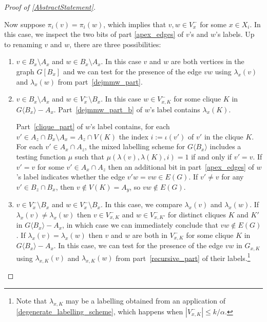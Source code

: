 \documentclass{patmorin}
\newcommand{\torso}[2]{{#1}\langle{#2}\rangle}
\renewcommand{\le}{\leqslant}
\begin{document}
\begin{proof}[Proof of \cref{AbstractStatement}]
\begin{enumerate}
      Now suppose $\pi_i(v)=\pi_i(w)$, which implies that $v,w\in V^-_x$ for some $x\in X_i$. In this case, we inspect the two bits of part \ref{apex_edges} of $v$'s and $w$'s labels.  Up to renaming $v$ and $w$, there are three possibilities:
      \begin{enumerate}
        \item $v\in B_x\setminus A_x$ and $w\in B_x\setminus A_x$.  In this case $v$ and $w$ are both vertices in the graph $G[B_x]$ and we can test for the presence of the edge $vw$ using $\lambda_x(v)$ and $\lambda_x(w)$ from part~\ref{dejmmw_part}.
        \item $v\in B_x\setminus A_x$ and $w\in V^-_x\setminus B_x$.  In this case $w\in V^-_{x,K}$ for some clique $K$ in $\torso{G}{B_x}-A_x$. Part~\ref{dejmmw_part_b} of $w$'s label contains $\lambda_x(K)$.

        Part~\ref{clique_part} of $w$'s label contains, for each $v'\in A_z\cap B_x\setminus A_x=A_z\cap V(K)$ the index $i:=\iota(v')$ of $v'$ in the clique $K$. For each $v'\in A_x\cap A_z$, the mixed labelling scheme for $\torso{G}{B_x}$ includes a testing function $\mu$ such that $\mu(\lambda(v),\lambda(K),i)=1$ if and only if $v'=v$.  If $v'=v$ for some $v'\in A_x\cap A_z$ then an additional bit in part~\ref{apex_edges} of $w$'s label indicates whether the edge $v'w=vw\in E(G)$.  If $v'\neq v$ for any $v'\in B_z\cap B_x$, then $v\not\in V(K)=A_y$, so $vw\not\in E(G)$.

        \item $v\in V^-_x\setminus B_x$ and $w\in V^-_x\setminus B_x$.  In this case, we compare $\lambda_x(v)$ and $\lambda_x(w)$.  If $\lambda_x(v)\neq\lambda_x(w)$ then $v\in V^-_{x,K}$ and $w\in V^-_{x,K'}$ for distinct cliques $K$ and $K'$ in $\torso{G}{B_x}-A_x$, in which case we can immediately conclude that $vw\not\in E(G)$.
        If $\lambda_x(v)=\lambda_x(w)$ then $v$ and $w$ are both in $V^-_{x,K}$ for some clique $K$ in $\torso{G}{B_x}-A_x$.  In this case, we can test for the presence of the edge $vw$ in $G_{x,K}$ using $\lambda_{x,K}(v)$ and $\lambda_{x,K}(w)$ from part~\ref{recursive_part} of their labels.\footnote{Note that $\lambda_{x,K}$ may be a labelling obtained from an application of \cref{degenerate_labelling_scheme}, which happens when $|V^-_{x,K}|\le k/\alpha$.} \qedhere
      \end{enumerate}
    \end{enumerate}
  \end{proof}
\end{document}
